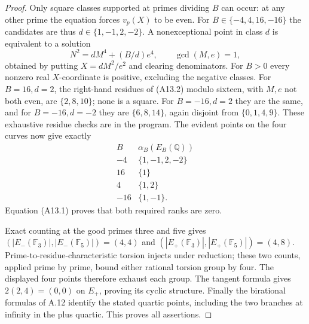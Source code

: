 \begin{proof}
Only square classes supported at primes dividing $B$ can occur:
at any other prime the equation forces $v_p(X)$ to be even.
For $B\in\{-4,4,16,-16\}$ the candidates are thus
$d\in\{1,-1,2,-2\}$. A nonexceptional point in class $d$ is equivalent
to a solution
\[
 N^2=dM^4+(B/d)e^4,\qquad \gcd(M,e)=1,
 \tag{A13.2}
\]
obtained by putting $X=dM^2/e^2$ and clearing denominators.
For $B>0$ every nonzero real $X$-coordinate is positive, excluding
the negative classes. For $B=16,d=2$, the right-hand residues of
(A13.2) modulo sixteen, with $M,e$ not both even, are
$\{2,8,10\}$; none is a square. For $B=-16,d=2$ they are the same,
and for $B=-16,d=-2$ they are $\{6,8,14\}$, again disjoint from
$\{0,1,4,9\}$. These exhaustive residue checks are in the program.
The evident points on the four curves now give exactly
\[
 \begin{array}{c|c}
 B&\alpha_B(E_B(\mathbb Q))\\\hline
 -4&\{1,-1,2,-2\}\\
 16&\{1\}\\
 4&\{1,2\}\\
 -16&\{1,-1\}.
 \end{array}
\]
Equation (A13.1) proves that both required ranks are zero.

Exact counting at the good primes three and five gives
$(|E_-(\mathbb F_3)|,|E_-(\mathbb F_5)|)=(4,4)$ and
$(|E_+(\mathbb F_3)|,|E_+(\mathbb F_5)|)=(4,8)$.
Prime-to-residue-characteristic torsion injects under reduction;
these two counts, applied prime by prime, bound either rational torsion
group by four. The displayed four points therefore exhaust each group.
The tangent formula gives $2(2,4)=(0,0)$ on $E_+$, proving its cyclic
structure. Finally the birational formulas of A.12 identify the stated
quartic points, including the two branches at infinity in the plus
quartic. This proves all assertions.
\end{proof}

